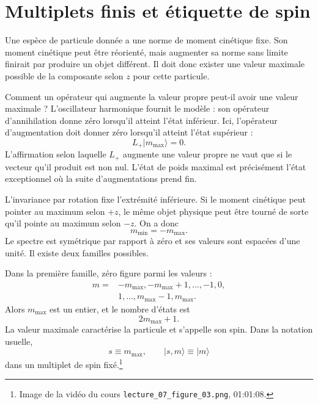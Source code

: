 \section{Multiplets finis et étiquette de spin}

Une espèce de particule donnée a une norme de moment cinétique fixe. Son moment cinétique peut être réorienté, mais augmenter sa norme sans limite finirait par produire un objet différent. Il doit donc exister une valeur maximale possible de la composante selon \(z\) pour cette particule.

Comment un opérateur qui augmente la valeur propre peut-il avoir une valeur maximale ? L’oscillateur harmonique fournit le modèle : son opérateur d’annihilation donne zéro lorsqu’il atteint l’état inférieur. Ici, l’opérateur d’augmentation doit donner zéro lorsqu’il atteint l’état supérieur :
\begin{equation}
L_+\lvert m_{\max}\rangle=0.
\end{equation}
L’affirmation selon laquelle \(L_+\) augmente une valeur propre ne vaut que si le vecteur qu’il produit est non nul. L’état de poids maximal est précisément l’état exceptionnel où la suite d’augmentations prend fin.

L’invariance par rotation fixe l’extrémité inférieure. Si le moment cinétique peut pointer au maximum selon \(+z\), le même objet physique peut être tourné de sorte qu’il pointe au maximum selon \(-z\). On a donc
\begin{equation}
m_{\min}=-m_{\max}.
\end{equation}
Le spectre est symétrique par rapport à zéro et ses valeurs sont espacées d’une unité. Il existe deux familles possibles.

Dans la première famille, zéro figure parmi les valeurs :
\begin{equation}
\begin{aligned}
m={}&-m_{\max},-m_{\max}+1,\ldots,-1,0,\\
&1,\ldots,m_{\max}-1,m_{\max}.
\end{aligned}
\end{equation}
Alors \(m_{\max}\) est un entier, et le nombre d’états est
\begin{equation}
2m_{\max}+1.
\end{equation}
La valeur maximale caractérise la particule et s’appelle son spin. Dans la notation usuelle,
\begin{equation}
s\equiv m_{\max},
\qquad
\lvert s,m\rangle\equiv\lvert m\rangle
\end{equation}
dans un multiplet de spin fixé.\footnote{\raggedright Image de la vidéo du cours \nolinkurl{lecture_07_figure_03.png}, 01:01:08.\par}

